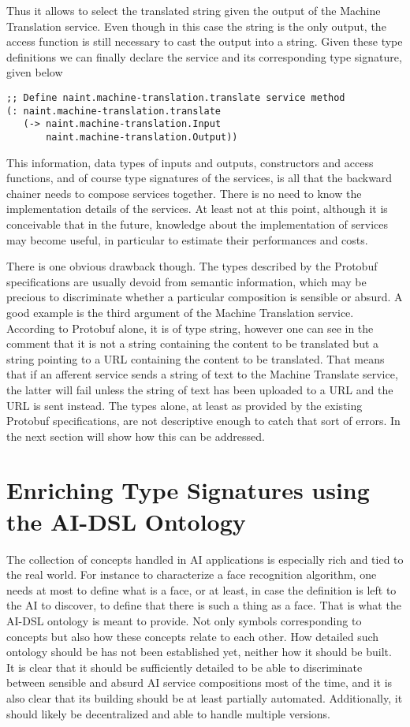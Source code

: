 \documentclass[]{report}
\begin{document}
Thus it allows to select the translated string given the output of the
Machine Translation service.  Even though in this case the string is
the only output, the access function is still necessary to cast the
output into a string.  Given these type definitions we can finally
declare the service and its corresponding type signature, given below
\begin{verbatim}
;; Define naint.machine-translation.translate service method
(: naint.machine-translation.translate
   (-> naint.machine-translation.Input
       naint.machine-translation.Output))
\end{verbatim}
This information, data types of inputs and outputs, constructors and
access functions, and of course type signatures of the services, is
all that the backward chainer needs to compose services together.
There is no need to know the implementation details of the services.
At least not at this point, although it is conceivable that in the
future, knowledge about the implementation of services may become
useful, in particular to estimate their performances and costs.

There is one obvious drawback though.  The types described by the
Protobuf specifications are usually devoid from semantic information,
which may be precious to discriminate whether a particular composition
is sensible or absurd.  A good example is the third argument of the
Machine Translation service.  According to Protobuf alone, it is of
type string, however one can see in the comment that it is not a
string containing the content to be translated but a string pointing
to a URL containing the content to be translated.  That means that if
an afferent service sends a string of text to the Machine Translate
service, the latter will fail unless the string of text has been
uploaded to a URL and the URL is sent instead.  The types alone, at
least as provided by the existing Protobuf specifications, are not
descriptive enough to catch that sort of errors.  In the next section
will show how this can be addressed.
\section{Enriching Type Signatures using the AI-DSL Ontology}

The collection of concepts handled in AI applications is especially
rich and tied to the real world.  For instance to characterize a face
recognition algorithm, one needs at most to define what is a face, or
at least, in case the definition is left to the AI to discover, to
define that there is such a thing as a face.  That is what the AI-DSL
ontology is meant to provide.  Not only symbols corresponding to
concepts but also how these concepts relate to each other.  How
detailed such ontology should be has not been established yet, neither
how it should be built.  It is clear that it should be sufficiently
detailed to be able to discriminate between sensible and absurd AI
service compositions most of the time, and it is also clear that its
building should be at least partially automated.  Additionally, it
should likely be decentralized and able to handle multiple versions.
\end{document}
